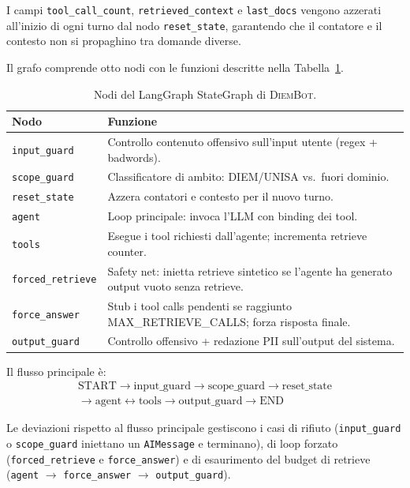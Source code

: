 \documentclass[11pt,a4paper]{article}
\newcommand{\code}[1]{\texttt{\small#1}}
\newcommand{\sys}{\textsc{DiemBot}}
\begin{document}
I campi \code{tool\_call\_count}, \code{retrieved\_context} e \code{last\_docs} vengono azzerati
all'inizio di ogni turno dal nodo \code{reset\_state}, garantendo che il contatore e il
contesto non si propaghino tra domande diverse.

Il grafo comprende otto nodi con le funzioni descritte nella Tabella~\ref{tab:nodes}.

\begin{table}[htbp]
\centering
\caption{Nodi del LangGraph StateGraph di \sys{}.}
\label{tab:nodes}
\small
\begin{tabularx}{\textwidth}{lX}
\toprule
\textbf{Nodo} & \textbf{Funzione} \\
\midrule
\code{input\_guard}    & Controllo contenuto offensivo sull'input utente (regex + badwords). \\
\code{scope\_guard}    & Classificatore di ambito: DIEM/UNISA vs.\ fuori dominio. \\
\code{reset\_state}    & Azzera contatori e contesto per il nuovo turno. \\
\code{agent}           & Loop principale: invoca l'LLM con binding dei tool. \\
\code{tools}           & Esegue i tool richiesti dall'agente; incrementa retrieve counter. \\
\code{forced\_retrieve}& Safety net: inietta retrieve sintetico se l'agente ha generato output vuoto senza retrieve. \\
\code{force\_answer}   & Stub i tool calls pendenti se raggiunto MAX\_RETRIEVE\_CALLS; forza risposta finale. \\
\code{output\_guard}   & Controllo offensivo + redazione PII sull'output del sistema. \\
\bottomrule
\end{tabularx}
\end{table}

Il flusso principale è:
\begin{multline*}
\text{START} \to \text{input\_guard} \to \text{scope\_guard} \to \text{reset\_state} \\
\to \text{agent} \leftrightarrow \text{tools} \to \text{output\_guard} \to \text{END}
\end{multline*}

\noindent Le deviazioni rispetto al flusso principale gestiscono i casi di rifiuto
(\code{input\_guard} o \code{scope\_guard} iniettano un \code{AIMessage} e terminano),
di loop forzato (\code{forced\_retrieve} e \code{force\_answer}) e di esaurimento
del budget di retrieve (\code{agent} $\to$ \code{force\_answer} $\to$ \code{output\_guard}).
\end{document}
